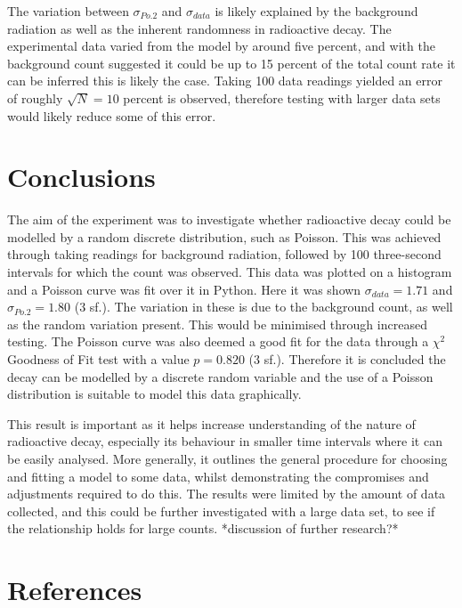 \documentclass[11pt]{article}
\begin{document}
\noindent The variation between $\sigma_{Po.2}$ and $\sigma_{data}$ is likely explained by the background radiation as well as the inherent randomness in radioactive decay. The experimental data varied from the model by around five percent, and with the background count suggested it could be up to 15 percent of the total count rate it can be inferred this is likely the case. Taking 100 data readings yielded an error of roughly $\sqrt{N} = 10$ percent is observed, therefore testing with larger data sets would likely reduce some of this error.  

    \section{Conclusions}
The aim of the experiment was to investigate whether radioactive decay could be modelled by a random discrete distribution, such as Poisson. This was achieved through taking readings for background radiation, followed by 100 three-second intervals for which the count was observed. This data was plotted on a histogram and a Poisson curve was fit over it in Python. Here it was shown $\sigma_{data} = 1.71$ and $\sigma_{Po.2} = 1.80$ (3 sf.). The variation in these is due to the background count, as well as the random variation present. This would be minimised through increased testing. The Poisson curve was also deemed a good fit for the data through a $\chi^{2}$ Goodness of Fit test with a value $p = 0.820$ (3 sf.). Therefore it is  concluded the decay can be modelled by a discrete random variable and the use of a Poisson distribution is suitable to model this data graphically.

\noindent This result is important as it helps increase understanding of the nature of radioactive decay, especially its behaviour in smaller time intervals where it can be easily analysed. More generally, it outlines the general procedure for choosing and fitting a model to some data, whilst demonstrating the compromises and adjustments required to do this. The results were limited by the amount of data collected, and this could be further investigated with a large data set, to see if the relationship holds for large counts. 
*discussion of further research?*
    \section{References}
 
\end{document}
